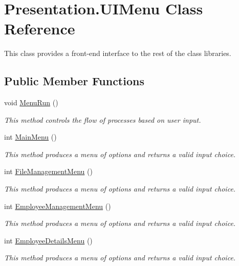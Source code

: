 \hypertarget{class_presentation_1_1_u_i_menu}{\section{Presentation.\-U\-I\-Menu Class Reference}
\label{class_presentation_1_1_u_i_menu}
}


This class provides a front-\/end interface to the rest of the class libraries.  


\subsection*{Public Member Functions}
\begin{DoxyCompactItemize}
\item 
void \hyperlink{class_presentation_1_1_u_i_menu_a4e34e326fa4b3ba8887d3877eb7a846f}{Menu\-Run} ()
\begin{DoxyCompactList}\small\item\em This method controls the flow of processes based on user input. \end{DoxyCompactList}\item 
int \hyperlink{class_presentation_1_1_u_i_menu_a7f962e64d48b9d10eda69ba385413a10}{Main\-Menu} ()
\begin{DoxyCompactList}\small\item\em This method produces a menu of options and returns a valid input choice. \end{DoxyCompactList}\item 
int \hyperlink{class_presentation_1_1_u_i_menu_aea2b74624816fae85bb9df7283ba2987}{File\-Management\-Menu} ()
\begin{DoxyCompactList}\small\item\em This method produces a menu of options and returns a valid input choice. \end{DoxyCompactList}\item 
int \hyperlink{class_presentation_1_1_u_i_menu_ad65730b7a0580f650730eb0b4a7b861f}{Employee\-Management\-Menu} ()
\begin{DoxyCompactList}\small\item\em This method produces a menu of options and returns a valid input choice. \end{DoxyCompactList}\item 
int \hyperlink{class_presentation_1_1_u_i_menu_a514c2390e6eed7254727637fe0172286}{Employee\-Details\-Menu} ()
\begin{DoxyCompactList}\small\item\em This method produces a menu of options and returns a valid input choice. \end{DoxyCompactList}\item 

\end{DoxyCompactItemize}
